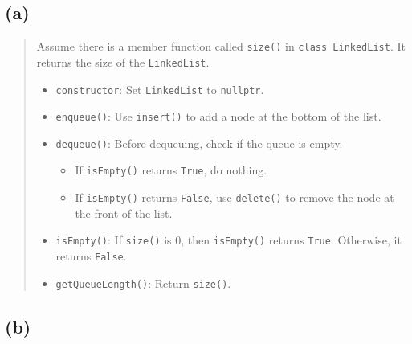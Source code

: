 \documentclass{article}
\begin{document}
\subsection*{(a)}
\begin{quote}
Assume there is a member function called \texttt{size()} in \texttt{class LinkedList}. It returns the size of the \texttt{LinkedList}.

\begin{itemize}
    \item \texttt{constructor}: Set \texttt{LinkedList} to \texttt{nullptr}.
    
    \item \texttt{enqueue()}: Use \texttt{insert()} to add a node at the bottom of the list.
    
    \item \texttt{dequeue()}: Before dequeuing, check if the queue is empty. 
    \begin{itemize}
        \item If \texttt{isEmpty()} returns \texttt{True}, do nothing.
        \item If \texttt{isEmpty()} returns \texttt{False}, use \texttt{delete()} to remove the node at the front of the list.
    \end{itemize}
    
    \item \texttt{isEmpty()}: If \texttt{size()} is 0, then \texttt{isEmpty()} returns \texttt{True}. Otherwise, it returns \texttt{False}.
    
    \item \texttt{getQueueLength()}: Return \texttt{size()}.
\end{itemize}
\end{quote}

\subsection*{(b)}
\begin{center}
\end{center}
\end{document}
